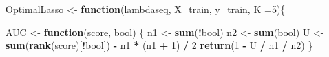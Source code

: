 \documentclass[
]{article}
\newenvironment{Shaded}{\begin{snugshade}}{\end{snugshade}}
\newcommand{\AttributeTok}[1]{\textcolor[rgb]{0.13,0.29,0.53}{#1}}
\newcommand{\ControlFlowTok}[1]{\textcolor[rgb]{0.13,0.29,0.53}{\textbf{#1}}}
\newcommand{\DecValTok}[1]{\textcolor[rgb]{0.00,0.00,0.81}{#1}}
\newcommand{\FunctionTok}[1]{\textcolor[rgb]{0.13,0.29,0.53}{\textbf{#1}}}
\newcommand{\NormalTok}[1]{#1}
\newcommand{\OtherTok}[1]{\textcolor[rgb]{0.56,0.35,0.01}{#1}}
\newcommand{\SpecialCharTok}[1]{\textcolor[rgb]{0.81,0.36,0.00}{\textbf{#1}}}
\begin{document}
\begin{Shaded}
\begin{Highlighting}[]
\NormalTok{OptimalLasso }\OtherTok{\textless{}{-}} \ControlFlowTok{function}\NormalTok{(lambdaseq, X\_train, y\_train, }\AttributeTok{K =}\DecValTok{5}\NormalTok{)\{}
  
\NormalTok{    AUC }\OtherTok{\textless{}{-}} \ControlFlowTok{function}\NormalTok{(score, bool) \{}
\NormalTok{      n1 }\OtherTok{\textless{}{-}} \FunctionTok{sum}\NormalTok{(}\SpecialCharTok{!}\NormalTok{bool)}
\NormalTok{      n2 }\OtherTok{\textless{}{-}} \FunctionTok{sum}\NormalTok{(bool)}
\NormalTok{      U  }\OtherTok{\textless{}{-}} \FunctionTok{sum}\NormalTok{(}\FunctionTok{rank}\NormalTok{(score)[}\SpecialCharTok{!}\NormalTok{bool]) }\SpecialCharTok{{-}}\NormalTok{ n1 }\SpecialCharTok{*}\NormalTok{ (n1 }\SpecialCharTok{+} \DecValTok{1}\NormalTok{) }\SpecialCharTok{/} \DecValTok{2}
      \FunctionTok{return}\NormalTok{(}\DecValTok{1} \SpecialCharTok{{-}}\NormalTok{ U }\SpecialCharTok{/}\NormalTok{ n1 }\SpecialCharTok{/}\NormalTok{ n2)}
\NormalTok{    \}}
    

\end{Highlighting}
\end{Shaded}
\end{document}
